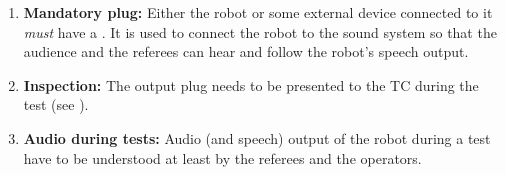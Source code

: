 \begin{enumerate}
	\item \textbf{Mandatory plug:} Either the robot or some external device connected to it \emph{must} have a . It is used to connect the robot to the sound system so that the audience and the referees can hear and follow the robot's speech output.
	\item \textbf{Inspection:} The output plug needs to be presented to the TC during the  test (see ).
	\item \textbf{Audio during tests:} Audio (and speech) output of the robot during a test have to be understood at least by the referees and the operators.
\end{enumerate}